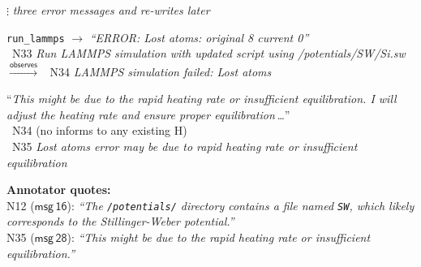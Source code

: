 \begin{tcolorbox}
\begin{description}[font=\sffamily\bfseries\small, leftmargin=12pt, style=sameline, itemsep=6pt]
\item[] {\color{gray} $\vdots$ \footnotesize\itshape three error messages and re-writes later}

\item[Msg\,27 \normalfont\textsf{(Observation)}]
\texttt{run\_lammps} $\to$ \emph{\enquote{ERROR: Lost atoms: original 8
current 0}}\\[2pt]
~N33 \emph{Run LAMMPS simulation with updated script using
/potentials/SW/Si.sw}
$\xrightarrow{\textsf{observes}}$
~N34 \emph{LAMMPS simulation failed: Lost atoms}

\item[Msg\,28 \normalfont\textsf{(Agent)}]
\enquote{\emph{This might be due to the rapid heating rate or insufficient
equilibration.  I will adjust the heating rate and ensure proper
equilibration\,\ldots}}\\[2pt]
~N34 \;(no \textsf{informs} to any existing H)\\
~N35 \emph{Lost atoms error may be due to rapid heating rate
or insufficient equilibration}

\end{description}

\medskip
\begin{center}
\end{center}

\smallskip\noindent
\textbf{Annotator quotes:}\\
\noindent N12 ($\mathsf{msg\,16}$): \emph{\enquote{The \texttt{/potentials/}
directory contains a file named \texttt{SW}, which likely corresponds to the
Stillinger-Weber potential.}}\\
\noindent N35 ($\mathsf{msg\,28}$): \emph{\enquote{This might be due to the rapid
heating rate or insufficient equilibration.}}


\end{tcolorbox}
